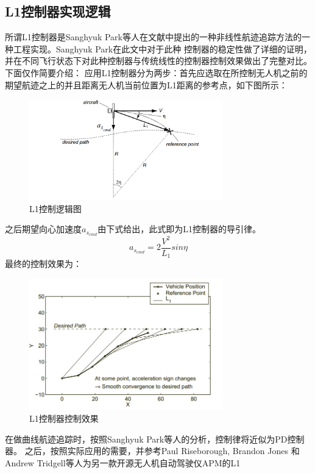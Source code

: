 \subsection{L1控制器实现逻辑}
所谓L1控制器是Sanghyuk Park等人在文献\cite{Park_2004}中提出的一种非线性航迹追踪方法的一种工程实现。Sanghyuk Park在此文中对于此种
控制器的稳定性做了详细的证明，并在不同飞行状态下对此种控制器与传统线性的控制器控制效果做出了完整对比。下面仅作简要介绍：
应用L1控制器分为两步：首先应选取在所控制无人机之前的期望航迹之上的并且距离无人机当前位置为L1距离的参考点，如下图\cite{Park_2004}所示：
\begin{figure}[H]
    \centering
    \includegraphics[width=0.75\textwidth]{figures/c3/L1_control}
    \caption{L1控制逻辑图}\label{fig:L1_control}
\end{figure}
之后期望向心加速度$a_{s_{cmd}}$由下式\cite{Park_2004}给出，此式即为L1控制器的导引律。
\begin{equation}
    a_{s_{cmd}}=2\frac{V^2}{L_1}sin\eta
\end{equation}
最终的控制效果为：
\begin{figure}[H]
    \centering
    \includegraphics[width=0.75\textwidth]{figures/c3/L1_eff}
    \caption{L1控制器控制效果}\label{fig：c3-L1_eff}
\end{figure}
在做曲线航迹追踪时，按照Sanghyuk Park等人的分析，控制律将近似为PD控制器。
之后，按照实际应用的需要，并参考Paul Riseborough, Brandon Jones 和 Andrew Tridgell等人为另一款开源无人机自动驾驶仪APM的L1
